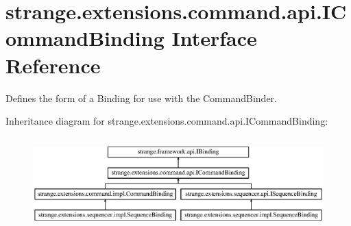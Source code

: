\hypertarget{interfacestrange_1_1extensions_1_1command_1_1api_1_1_i_command_binding}{\section{strange.\-extensions.\-command.\-api.\-I\-Command\-Binding Interface Reference}
\label{interfacestrange_1_1extensions_1_1command_1_1api_1_1_i_command_binding}
}


Defines the form of a Binding for use with the Command\-Binder.  


Inheritance diagram for strange.\-extensions.\-command.\-api.\-I\-Command\-Binding\-:\begin{figure}[H]
\begin{center}
\leavevmode
\includegraphics[height=3.544304cm]{interfacestrange_1_1extensions_1_1command_1_1api_1_1_i_command_binding}
\end{center}
\end{figure}
